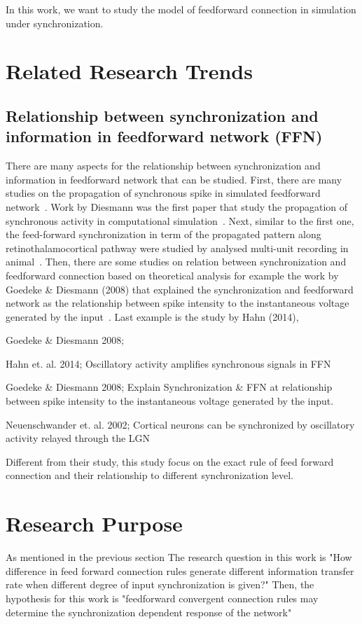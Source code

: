 In this work, we want to study the model of feedforward connection in simulation under synchronization.

\section{Related Research Trends}
\subsection{Relationship between synchronization and information in feedforward network (FFN)}

There are many aspects for the relationship between synchronization and information in feedforward network that can be studied. First, there are many studies on the propagation of synchronous spike in simulated feedforward network~\cite{diesmann1999stable, kumar2008conditions,abeles2004modeling}. Work by Diesmann was the first paper that study the propagation of synchronous activity in computational simulation~\cite{diesmann1999stable}. Next, similar to the first one, the feed-forward synchronization in term of the propagated pattern along retinothalamocortical pathway were studied by analysed multi-unit recording in animal~\cite{neuenschwander2002feed }.
Then, there are some studies on relation between synchronization and feedforward connection based on theoretical analysis for example the work by Goedeke \& Diesmann (2008) that
explained the synchronization and feedforward network as the relationship between spike intensity to the instantaneous voltage generated by the input~\cite{goedeke2008mechanism}.  
Last example is the study by Hahn (2014),  

Goedeke & Diesmann 2008;  

Hahn et. al. 2014; 
Oscillatory activity amplifies synchronous signals in FFN


Goedeke & Diesmann 2008;  
Explain Synchronization & FFN at relationship between spike intensity to the instantaneous voltage generated by the input. 


Neuenschwander et. al. 2002;
	 Cortical neurons can be synchronized by oscillatory activity relayed through the LGN


Different from their study, this study focus on the exact rule of feed forward connection and their relationship to different synchronization level.


\section{Research Purpose}
As mentioned in the previous section
The research question in this work is "How difference in feed forward connection rules generate different information transfer rate when different degree of input synchronization is given?"
Then, the hypothesis for this work is "feedforward convergent connection rules may determine the synchronization dependent response of the network"
